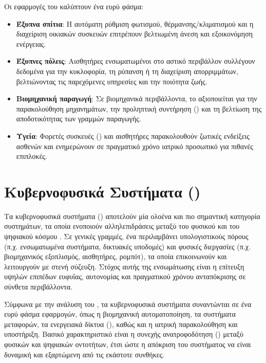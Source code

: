 Οι εφαρμογές του  καλύπτουν ένα ευρύ φάσμα:
\begin{itemize}
  \item \textbf{Έξυπνα σπίτια}: Η αυτόματη ρύθμιση φωτισμού, θέρμανσης/κλιματισμού και η διαχείριση οικιακών συσκευών επιτρέπουν βελτιωμένη άνεση και εξοικονόμηση ενέργειας.
  \item \textbf{Έξυπνες πόλεις}: Αισθητήρες ενσωματωμένοι στο αστικό περιβάλλον συλλέγουν δεδομένα για την κυκλοφορία, τη ρύπανση ή τη διαχείριση απορριμμάτων, βελτιώνοντας τις παρεχόμενες υπηρεσίες και την ποιότητα ζωής.
  \item \textbf{Βιομηχανική παραγωγή}: Σε βιομηχανικά περιβάλλοντα, το  αξιοποιείται για την παρακολούθηση μηχανημάτων, την προληπτική συντήρηση () και τη βελτίωση της αποδοτικότητας των γραμμών παραγωγής.
  \item \textbf{Υγεία}: Φορετές συσκευές () και αισθητήρες παρακολουθούν ζωτικές ενδείξεις ασθενών και ενημερώνουν σε πραγματικό χρόνο ιατρικό προσωπικό για πιθανές επιπλοκές.
\end{itemize}

\section{Κυβερνοφυσικά Συστήματα ()}

Τα κυβερνοφυσικά συστήματα () αποτελούν μία ολοένα και πιο σημαντική κατηγορία
συστημάτων, τα οποία ενοποιούν αλληλεπιδράσεις μεταξύ του φυσικού και του ψηφιακού
κόσμου \cite{Lee2008, Rajkumar2010, Baheti2011}. Σε γενικές γραμμές, ένα 
περιλαμβάνει υπολογιστικούς πόρους (π.χ. ενσωματωμένα συστήματα, δικτυακές υποδομές)
και φυσικές διεργασίες (π.χ. βιομηχανικός εξοπλισμός, αισθητήρες, ρομπότ), τα οποία
επικοινωνούν και λειτουργούν με στενή σύζευξη. Στόχος αυτής της ενσωμάτωσης είναι η
επίτευξη υψηλών επιπέδων ευφυΐας, αυτονομίας και πραγματικού χρόνου ανταπόκρισης
σε σύνθετα περιβάλλοντα.

Σύμφωνα με την ανάλυση του  \cite{Lee2008}, τα κυβερνοφυσικά συστήματα συναντώνται
σε ένα ευρύ φάσμα εφαρμογών, όπως η βιομηχανική αυτοματοποίηση, τα συστήματα μεταφορών,
τα ενεργειακά δίκτυα (), καθώς και η ιατρική παρακολούθηση και υποστήριξη.
Βασικό χαρακτηριστικό είναι η συνεχής ανατροφοδότηση () μεταξύ φυσικών
και ψηφιακών οντοτήτων, έτσι ώστε η απόκριση του συστήματος να είναι δυναμική και
εξαρτώμενη από τις εκάστοτε συνθήκες.

